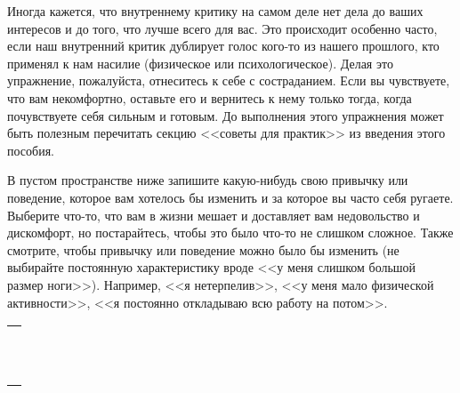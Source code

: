 Иногда кажется, что внутреннему критику на самом деле нет дела до ваших интересов и до того, что лучше всего для вас. Это происходит особенно часто, если наш внутренний критик дублирует голос кого-то из нашего прошлого, кто применял к нам насилие (физическое или психологическое). Делая это упражнение, пожалуйста, отнеситесь к себе с состраданием. Если вы чувствуете, что вам некомфортно, оставьте его и вернитесь к нему только тогда, когда почувствуете себя сильным и готовым. До выполнения этого упражнения может быть полезным перечитать секцию <<советы для практик>> из введения этого пособия.

\begin{itemize}
	\itemWritingHand В пустом пространстве ниже запишите какую-нибудь свою привычку или поведение, которое вам хотелось бы изменить и за которое вы часто себя ругаете. Выберите что-то, что вам в жизни мешает и доставляет вам недовольство и дискомфорт, но постарайтесь, чтобы это было что-то не слишком сложное. Также смотрите, чтобы привычку или поведение можно было бы изменить (не выбирайте постоянную характеристику вроде <<у меня слишком большой размер ноги>>). Например, <<я нетерпелив>>, <<у меня мало физической активности>>, <<я постоянно откладываю всю работу на потом>>.
\end{itemize}
\setlength{\extrarowheight}{2mm}
\begin{tabularx}{\textwidth}{X}
	\\
	\arrayrulecolor{gray}\hline\\
	\hline\\
	\hline\\
	\hline\\
	\hline\\
	\hline\\	
	\hline\\
	\hline\\
	\hline\\
	\hline\\
	\hline\\
	\hline\\
\end{tabularx}
\setlength{\extrarowheight}{0mm}

